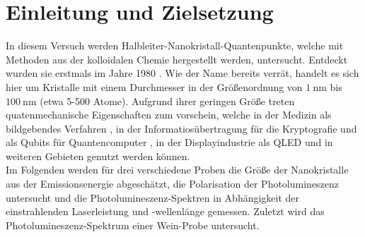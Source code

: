 \section{Einleitung und Zielsetzung}
\label{sec:Ziel}
In diesem Versuch werden Halbleiter-Nanokristall-Quantenpunkte, welche mit Methoden
aus der kolloidalen Chemie hergestellt werden, untersucht. Entdeckt wurden sie erstmals
im Jahre 1980 \cite{eki}. Wie der Name bereits verrät, handelt es sich hier um
Kristalle mit einem Durchmesser in der Größenordnung von $\SI{1}{\nano\meter}$ bis
$\SI{100}{\nano\meter}$ (etwa 5-500 Atome). Aufgrund ihrer geringen Größe treten
quatenmechanische Eigenschaften zum vorschein, welche in der Medizin als bildgebendes
Verfahren \cite{biom}, in der Informatiosübertragung für die Kryptografie \cite{cryp}
und als Qubits für Quantencomputer \cite{compt}, in der Displayindustrie als QLED
\cite{qled} und in weiteren Gebieten genutzt werden können.\\
Im Folgenden werden für drei verschiedene Proben die Größe der Nanokristalle aus
der Emissionsenergie abgeschätzt, die Polarisation der Photolumineszenz untersucht
und die Photolumineszenz-Spektren in Abhängigkeit der einstrahlenden Laserleistung
und -wellenlänge gemessen. Zuletzt wird das Photolumineszenz-Spektrum einer Wein-Probe
untersucht.

